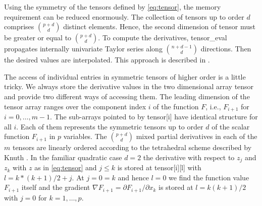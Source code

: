 \documentclass[11pt,twoside]{article}
\begin{document}
%
Using the symmetry of the tensors defined by \eqref{eq:tensor}, the memory  
requirement can be reduced enormously. The collection of  tensors up to order $d$ comprises  
$\binom{p+d}{d}$ distinct elements. Hence, the second dimension of {\sf tensor} must be 
greater or equal to $\binom{p+d}{d}$.
To compute the derivatives, {\sf tensor\_eval} propagates internally univariate Taylor 
series along $\binom{n+d-1}{d}$ directions. Then the desired values are interpolated. This
approach is described in \cite{Griewank97}.

The access of individual entries in symmetric tensors of
higher order is a little tricky. We always store the derivative
values in the two dimensional array {\sf tensor} and provide two 
different ways of accessing them.  
The leading dimension of the tensor array ranges over 
the component index $i$ of the function $F$, i.e., $F_{i+1}$ for $i =
0,\ldots,m-1$. The sub-arrays pointed to by {\sf tensor[i]} have identical
structure for all $i$. Each of them represents the symmetric tensors up to
order $d$ of the scalar function $F_{i+1}$ in $p$ variables.  
%
The $\binom{p+d}{d}$ mixed partial derivatives in each of the $m$
tensors are linearly ordered according to the tetrahedral 
scheme described by Knuth \cite{Knuth73}. In the familiar quadratic 
case $d=2$ the derivative with respect to $z_j$ and $z_k$ with $z$ 
as in \eqref{eq:tensor} and $j \leq k$ is stored at {\sf tensor[i][l]} with 
$l = k*(k+1)/2+j$. At $j = 0 = k$ and hence $l = 0$ we find the
function value $F_{i+1}$ itself and the gradient 
$\nabla F_{i+1}= \partial F_{i+1}/\partial x_k $ is stored at $l=k(k+1)/2$
with $j=0$ for $k=1,\ldots,p$.
\end{document}
